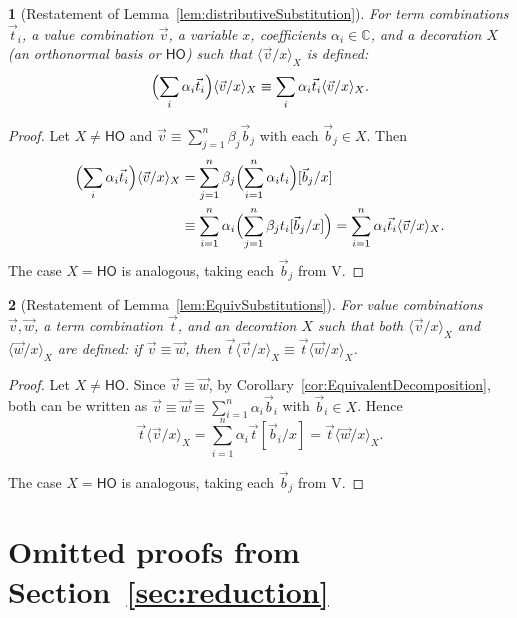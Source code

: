 \documentclass[a4paper,UKenglish,numberwithinsect,pdfa,anonymous]{lipics-v2021}
\theoremstyle{restatestyle}
\newtheorem*{restatelemma}{}
\newcommand\s[1]{\ensuremath{\mathsf{#1}}}
\newcommand\Val{{\s V}}
\newcommand\ansubst[2]{\ensuremath{\langle #1 \rangle_{#2}}}
\newcommand\AbsBasis{\ensuremath{\mathsf{H\!O}}}
\def\C{\mathbb{C}}            %
\def\Val{\mathrm{V}}          %
\begin{document}
\begin{restatelemma}[Restatement of Lemma~\ref{lem:distributiveSubstitution}]
  \itshape
  For term combinations $\vec{t}_{i}$, a value combination $\vec{v}$, a
  variable $x$, coefficients $\alpha_i\in\C$, and a decoration $X$ (an
  orthonormal basis or $\AbsBasis$) such that $\ansubst{\vec v/x}{X}$ is defined:
  \[
    \Bigl(\sum_i \alpha_i\vec{t}_{i}\Bigr)\ansubst{\vec v/x}{X}
    \equiv
    \sum_i \alpha_i\vec{t}_{i} \ansubst{\vec v/x}{X}.
  \]
\end{restatelemma}
\begin{proof}
  Let $X\neq\AbsBasis$ and
  $\vec{v}\equiv\sum_{j=1}^n\beta_j\vec{b}_{j}$ with each $\vec{b}_{j}\in X$.
  Then
  \begin{align*}
    \Bigl(\sum_i \alpha_i\vec{t}_{i}\Bigr)\ansubst{\vec v/x}{X}
    &= \sum_{j=1}^n \beta_j\Bigl(\sum_{i=1}^{n}\alpha_i t_i\Bigr)[\vec{b}_{j}/x]\\
    &\equiv \sum_{i=1}^{n}\alpha_i\Bigl(\sum_{j=1}^n\beta_j t_i[\vec{b}_{j}/x]\Bigr)
    = \sum_{i=1}^{n}\alpha_i\vec{t}_{i}\ansubst{\vec v/x}{X}.
  \end{align*}
  The case $X=\AbsBasis$ is analogous, taking each $\vec{b}_j$ from $\Val$.
\end{proof}

\begin{restatelemma}[Restatement of Lemma~\ref{lem:EquivSubstitutions}]
  \itshape
  For value combinations $\vec{v},\vec{w}$, a term combination $\vec{t}$, and
  an decoration $X$ such that both
  $\ansubst{\vec{v}/x}{X}$ and $\ansubst{\vec{w}/x}{X}$ are defined:
  if $\vec{v}\equiv\vec{w}$, then
  $\vec{t}\ansubst{\vec{v}/x}{X}
  \equiv\vec{t}\ansubst{\vec{w}/x}{X}$.
\end{restatelemma}
\begin{proof}
  Let $X\neq\AbsBasis$. Since $\vec{v}\equiv\vec{w}$, by
  Corollary~\ref{cor:EquivalentDecomposition},
  both can be written as
  $\vec{v}\equiv\vec{w}\equiv\sum_{i=1}^{n}\alpha_i\vec{b}_{i}$ with
  $\vec{b}_{i}\in X$. Hence
  \[
    \vec{t}\ansubst{\vec{v}/x}{X}
    = \sum_{i=1}^{n}\alpha_i\vec{t}[\vec{b}_{i}/x]
    = \vec{t}\ansubst{\vec{w}/x}{X}.
    \tag*{\qedhere}
  \]

  The case $X=\AbsBasis$ is analogous, taking each $\vec{b}_j$ from $\Val$.
\end{proof}

\section{Omitted proofs from Section~\ref{sec:reduction}}\label{sec:appendixB}
\end{document}
